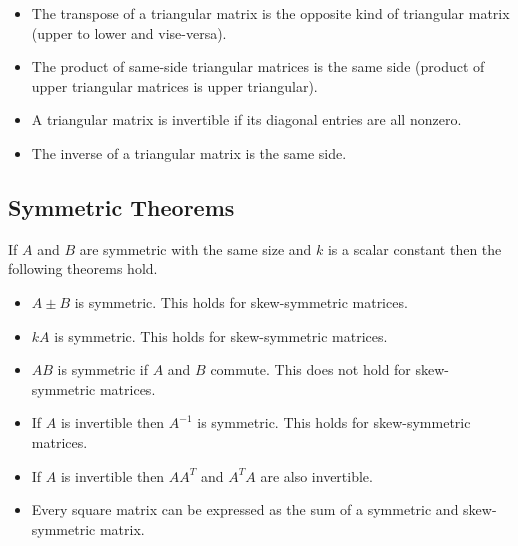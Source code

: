 \documentclass[12pt]{article}
\begin{document}
\begin{itemize}
    \item The transpose of a triangular matrix is the opposite kind of triangular matrix (upper to lower and vise-versa).
    \item The product of same-side triangular matrices is the same side (product of upper triangular matrices is upper triangular).
    \item A triangular matrix is invertible if its diagonal entries are all nonzero.
    \item The inverse of a triangular matrix is the same side.
\end{itemize}


\subsection{Symmetric Theorems}

If $A$ and $B$ are symmetric with the same size and $k$ is a scalar constant then the following theorems hold.
\begin{itemize}
    \item $A \pm B$ is symmetric. This holds for skew-symmetric matrices.
    \item $kA$ is symmetric. This holds for skew-symmetric matrices.
    \item $AB$ is symmetric if $A$ and $B$ commute. This does not hold for skew-symmetric matrices.
    \item If $A$ is invertible then $A^{-1}$ is symmetric. This holds for skew-symmetric matrices.
    \item If $A$ is invertible then $AA^T$ and $A^TA$ are also invertible.
    \item Every square matrix can be expressed as the sum of a symmetric and skew-symmetric matrix.
\end{itemize}
\end{document}
